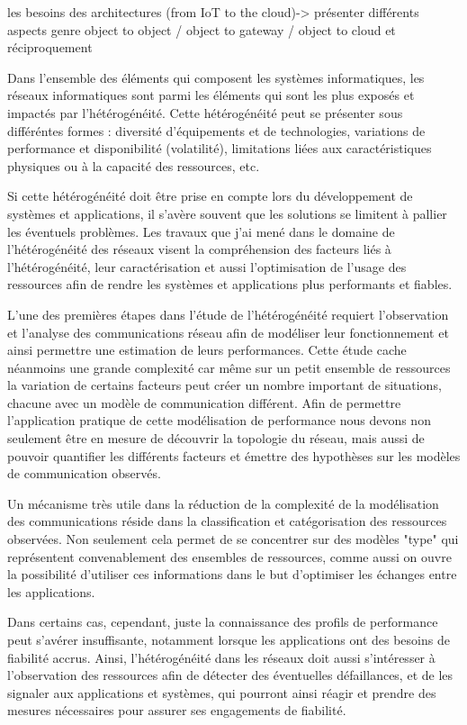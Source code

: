 
les besoins des architectures (from IoT to the cloud)-> présenter différents aspects genre object to object / object to gateway / object to cloud et réciproquement

\begin{resume}
	Dans l'ensemble des éléments qui composent les systèmes informatiques, les réseaux informatiques sont parmi les éléments qui sont les plus exposés et impactés par l'hétérogénéité. Cette hétérogénéité peut se présenter sous différéntes formes : diversité d'équipements et de technologies, variations de performance et disponibilité (volatilité), limitations liées aux caractéristiques physiques ou à la capacité des ressources, etc. 
	
	Si cette hétérogénéité doit être prise en compte lors du développement de systèmes et applications, il s'avère souvent que les solutions se limitent à pallier les éventuels problèmes. Les travaux que j'ai mené dans le domaine de l'hétérogénéité des réseaux visent la compréhension des facteurs liés à l'hétérogénéité, leur caractérisation et aussi l'optimisation de l'usage des ressources afin de rendre les systèmes et applications plus performants et fiables.
	
	L'une des premières étapes dans l'étude de l'hétérogénéité requiert l'observation et l'analyse des communications réseau afin de modéliser leur fonctionnement et ainsi permettre une estimation de leurs performances. Cette étude cache néanmoins une grande complexité car même sur un petit ensemble de ressources la variation de certains facteurs peut créer un nombre important de situations, chacune avec un modèle de communication différent. Afin de permettre l'application pratique de cette modélisation de performance nous devons non seulement être en mesure de découvrir la topologie du réseau, mais aussi de pouvoir quantifier les différents facteurs et émettre des hypothèses sur les modèles de communication observés. 
	
	Un mécanisme très utile dans la réduction de la complexité de la modélisation des communications réside dans la classification et catégorisation des ressources observées. Non seulement cela permet de se concentrer sur des modèles "type" qui représentent convenablement des ensembles de ressources, comme aussi on ouvre la possibilité d'utiliser ces informations dans le but d'optimiser les échanges entre les applications.
	
	Dans certains cas, cependant, juste la connaissance des profils de performance peut s'avérer insuffisante, notamment lorsque les applications ont des besoins de fiabilité accrus. Ainsi, l'hétérogénéité dans les réseaux doit aussi s'intéresser à l'observation des ressources afin de détecter des éventuelles défaillances, et de les signaler aux applications et systèmes, qui pourront ainsi réagir et prendre des mesures nécessaires pour assurer ses engagements de fiabilité. 
	

\end{resume}
